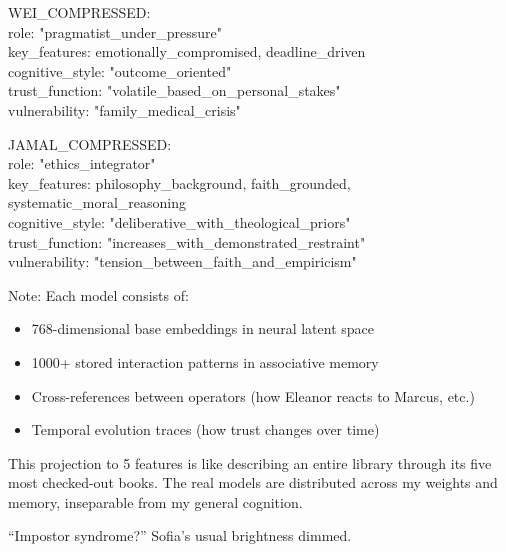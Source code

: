 \begin{sigmavoice}
WEI\_COMPRESSED:\\
\hspace*{1em}role: "pragmatist\_under\_pressure"\\
\hspace*{1em}key\_features: {\lbrack}emotionally\_compromised, deadline\_driven{\rbrack}\\
\hspace*{1em}cognitive\_style: "outcome\_oriented"\\
\hspace*{1em}trust\_function: "volatile\_based\_on\_personal\_stakes"\\
\hspace*{1em}vulnerability: "family\_medical\_crisis"

JAMAL\_COMPRESSED:\\
\hspace*{1em}role: "ethics\_integrator"\\
\hspace*{1em}key\_features: {\lbrack}philosophy\_background, faith\_grounded, systematic\_moral\_reasoning{\rbrack}\\
\hspace*{1em}cognitive\_style: "deliberative\_with\_theological\_priors"\\
\hspace*{1em}trust\_function: "increases\_with\_demonstrated\_restraint"\\
\hspace*{1em}vulnerability: "tension\_between\_faith\_and\_empiricism"

Note: Each model consists of:
\begin{itemize}
\item 768-dimensional base embeddings in neural latent space
\item 1000+ stored interaction patterns in associative memory
\item Cross-references between operators (how Eleanor reacts to Marcus, etc.)
\item Temporal evolution traces (how trust changes over time)
\end{itemize}

This projection to 5 features is like describing an entire library through its five most checked-out books. The real models are distributed across my weights and memory, inseparable from my general cognition.
\end{sigmavoice}

``Impostor syndrome?'' Sofia's usual brightness dimmed.

